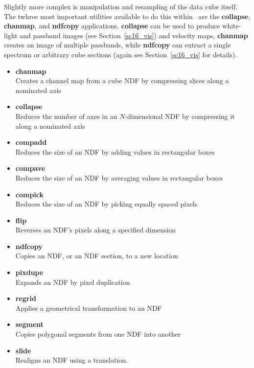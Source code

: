 \documentclass[twoside,11pt]{article}
\newcommand{\htmlref}[2]{#1}
\newcommand{\xref}[3]{#1}
\newcommand{\latex}[1]{#1}
\begin{document}
{Slightly more complex is manipulation and resampling of the data cube
itself.  The twhree most important utilities available to do this within
\KAPPA\ are the \xref{{\bf collapse}}{sun95}{COLLAPSE}, 
\xref{{\bf chanmap}}{sun95}{CHANMAP}, and
\xref{{\bf ndfcopy}}{sun95}{NDFCOPY} applications.  {\bf collapse} can
be used to produce \htmlref{white-light and passband}{sc16_vis} images\latex{ (see 
Section~\ref{sc16_vis})} and velocity maps, {\bf chanmap} creates an
image of multiple passbands, while {\bf ndfcopy} can extract a single spectrum or 
\htmlref{arbitrary cube sections}{sc16_vis} \latex{ (again see Section~\ref{sc16_vis} for
details)}.

\begin{itemize}
\item{\xref{{\bf chanmap}}{sun95}{CHANMAP}}\\
Creates a channel map from a cube NDF by compressing slices along a nominated axis
\item{\xref{{\bf collapse}}{sun95}{COLLAPSE}}\\
Reduces the number of axes in an $N$-dimensional NDF by compressing it along a nominated axis 
\item{\xref{{\bf compadd}}{sun95}{COMPADD}}\\
Reduces the size of an NDF by adding values in rectangular boxes 
\item{\xref{{\bf compave}}{sun95}{COMPAVE}}\\
Reduces the size of an NDF by averaging values in rectangular boxes 
\item{\xref{{\bf compick}}{sun95}{COMPICK}}\\
Reduces the size of an NDF by picking equally spaced pixels 
\item{\xref{{\bf flip}}{sun95}{FLIP}}\\
Reverses an NDF's pixels along a specified dimension 
\item{\xref{{\bf ndfcopy}}{sun95}{NDFCOPY}}\\
Copies an NDF, or an NDF section, to a new location 
\item{\xref{{\bf pixdupe}}{sun95}{PIXDUPE}}\\
Expands an NDF by pixel duplication 
\item{\xref{{\bf regrid}}{sun95}{REGRID}}\\
Applies a geometrical transformation to an NDF
\item{\xref{{\bf segment}}{sun95}{SEGMENT}}\\
Copies polygonal segments from one NDF into another 
\item{\xref{{\bf slide}}{sun95}{SLIDE}}\\
Realigns an NDF using a translation.
\end{itemize}

}
\end{document}
